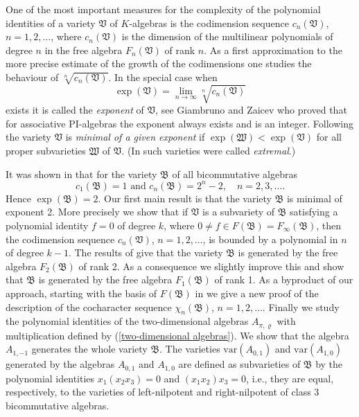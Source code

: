 \documentclass{amsart}[12pt]
\theoremstyle{definition}
\begin{document}
One of the most important measures for the complexity of the polynomial identities of a variety $\mathfrak V$ of $K$-algebras
is the codimension sequence $c_n({\mathfrak V})$,  $n=1,2,\ldots$, where
$c_n({\mathfrak V})$ is the dimension of the multilinear polynomials of degree $n$ in the free algebra $F_n({\mathfrak V})$ of rank $n$.
As a first approximation to the more precise estimate
of the growth of the codimensions one studies the behaviour of $\displaystyle \sqrt[n]{c_n({\mathfrak V})}$.
In the special case when
\[
\exp({\mathfrak V})=\lim_{n\to\infty}\sqrt[n]{c_n({\mathfrak V})}
\]
exists it is called the {\it exponent} of $\mathfrak V$, see Giambruno and Zaicev \cite{GZ1, GZ2}
who proved that for associative PI-algebras the exponent always exists and is an integer.
Following \cite{GZ3} the variety $\mathfrak V$ is {\it minimal of a given exponent} if
$\exp({\mathfrak W})<\exp({\mathfrak V})$ for all proper subvarieties $\mathfrak W$ of $\mathfrak V$.
(In \cite{D1} such varieties were called {\it extremal}.)

It was shown in \cite{DIT} that for the variety $\mathfrak B$ of all bicommutative algebras
\[
c_1({\mathfrak B})=1 \text{ and } c_n({\mathfrak B})=2^n-2,\quad n=2,3,\ldots.
\]
Hence $\exp({\mathfrak B})=2$. Our first main result is that the variety $\mathfrak B$ is minimal of exponent 2.
More precisely we show that if $\mathfrak V$ is a subvariety of $\mathfrak B$
satisfying a polynomial identity $f=0$ of degree $k$, where $0\not=f\in F({\mathfrak B})=F_{\infty}({\mathfrak B})$, then the codimension sequence
$c_n({\mathfrak V})$, $n=1,2,\ldots$,
is bounded by a polynomial in $n$ of degree $k-1$. The results of \cite{DIT} give that the variety $\mathfrak B$ is generated
by the free algebra $F_2({\mathfrak B})$ of rank 2. As a consequence we slightly improve this and show that $\mathfrak B$ is generated
by the free algebra $F_1({\mathfrak B})$ of rank 1. As a byproduct of our approach, starting with the basis of  $F({\mathfrak B})$ in \cite{DIT}
we give a new proof of the description of the cocharacter sequence $\chi_n({\mathfrak B})$, $n=1,2,\ldots$.
Finally we study the polynomial identities of the two-dimensional algebras $A_{\pi,\varrho}$
with multiplication defined by (\ref{two-dimensional algebras}).
We show that the algebra $A_{1,-1}$ generates the whole variety $\mathfrak B$. The varieties
$\text{var}(A_{0,1})$ and $\text{var}(A_{1,0})$ generated by the algebras $A_{0,1}$ and $A_{1,0}$
are defined as subvarieties of $\mathfrak B$ by the polynomial identities $x_1(x_2x_3)=0$ and $(x_1x_2)x_3=0$,
i.e., they are equal, respectively, to the varieties of left-nilpotent and right-nilpotent of class 3 bicommutative algebras.
\end{document}
